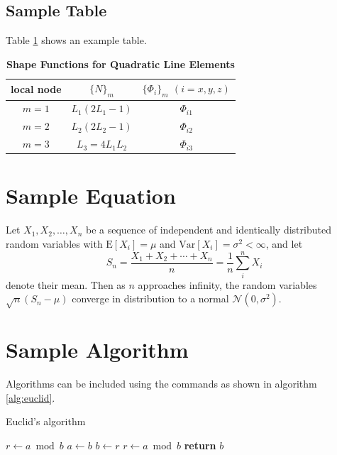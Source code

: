 \documentclass[9pt,twocolumn,twoside]{opticajnl}
\begin{document}
\subsection{Sample Table}

Table \ref{tab:shape-functions} shows an example table.

\begin{table}[htbp]
  \centering
  \caption{\bf Shape Functions for Quadratic Line Elements}
  \begin{tabular}{ccc}
    \hline
    local node & $\{N\}_m$     & $\{\Phi_i\}_m$ $(i=x,y,z)$ \\
    \hline
    $m = 1$    & $L_1(2L_1-1)$ & $\Phi_{i1}$                \\
    $m = 2$    & $L_2(2L_2-1)$ & $\Phi_{i2}$                \\
    $m = 3$    & $L_3=4L_1L_2$ & $\Phi_{i3}$                \\
    \hline
  \end{tabular}
  \label{tab:shape-functions}
\end{table}

\section{Sample Equation}

Let $X_1, X_2, \ldots, X_n$ be a sequence of independent and identically distributed random variables with $\text{E}[X_i] = \mu$ and $\text{Var}[X_i] = \sigma^2 < \infty$, and let
\begin{equation}
  S_n = \frac{X_1 + X_2 + \cdots + X_n}{n}
  = \frac{1}{n}\sum_{i}^{n} X_i
  \label{eq:refname1}
\end{equation}
denote their mean. Then as $n$ approaches infinity, the random variables $\sqrt{n}(S_n - \mu)$ converge in distribution to a normal $\mathcal{N}(0, \sigma^2)$.

\section{Sample Algorithm}

Algorithms can be included using the commands as shown in algorithm \ref{alg:euclid}.

\begin{algorithm}
  \caption{Euclid’s algorithm}\label{alg:euclid}
  \begin{algorithmic}[1]
    \State $r\gets a\bmod b$
    \State $a\gets b$
    \State $b\gets r$
    \State $r\gets a\bmod b$
    \EndWhile\label{euclidendwhile}
    \State \textbf{return} $b$
    \EndProcedure
  \end{algorithmic}
\end{algorithm}
\end{document}
